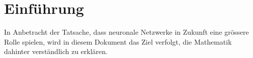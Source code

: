 \chapter{Einführung}
In Anbetracht der Tatsache, dass neuronale Netzwerke in Zukunft eine grössere Rolle spielen, wird in diesem Dokument
das Ziel verfolgt, die Mathematik dahinter verständlich zu erklären.